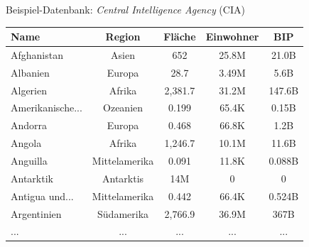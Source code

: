 \begin{frame}[fragile]{Beispiel-Datenbank: \textit{Central Intelligence Agency} (CIA)}
  \begin{table}
    \centering
    \tiny
    \begin{tabular}{lcccc}
      \toprule
      \textbf{Name}    & \textbf{Region} & \textbf{Fläche} & \textbf{Einwohner} & \textbf{BIP} \\
      \midrule
      Afghanistan      & Asien           & 652             & 25.8M              & 21.0B        \\
      Albanien         & Europa          & 28.7            & 3.49M              & 5.6B         \\
      Algerien         & Afrika          & 2,381.7         & 31.2M              & 147.6B       \\
      Amerikanische... & Ozeanien        & 0.199           & 65.4K              & 0.15B        \\
      Andorra          & Europa          & 0.468           & 66.8K              & 1.2B         \\
      Angola           & Afrika          & 1,246.7         & 10.1M              & 11.6B        \\
      Anguilla         & Mittelamerika   & 0.091           & 11.8K              & 0.088B       \\
      Antarktik        & Antarktis       & 14M             & 0                  & 0            \\
      Antigua und...   & Mittelamerika   & 0.442           & 66.4K              & 0.524B       \\
      Argentinien      & Südamerika      & 2,766.9         & 36.9M              & 367B         \\
      \midrule
      ...              & ...             & ...             & ...                & ...          \\
      \bottomrule
    \end{tabular}
  \end{table}
\end{frame}


